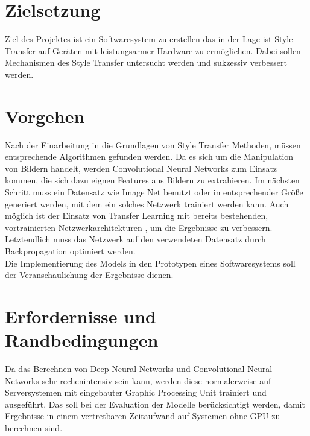 \section{Zielsetzung}
Ziel des Projektes ist ein Softwaresystem zu erstellen das in der Lage ist
Style Transfer auf Geräten mit leistungsarmer Hardware zu ermöglichen. Dabei sollen Mechanismen des Style Transfer
untersucht werden und sukzessiv verbessert werden.

\section{Vorgehen}
Nach der Einarbeitung in die Grundlagen von Style Transfer \cite{DBLP:journals/corr/GatysEB15a} \cite{DBLP:journals/corr/JohnsonAL16} Methoden,
müssen entsprechende Algorithmen gefunden werden. Da es sich um die Manipulation von Bildern handelt, werden Convolutional Neural Networks
\cite{lecun-gradientbased-learning-applied-1998} zum Einsatz kommen, die sich dazu eignen Features aus Bildern zu extrahieren. 
Im nächsten Schritt muss ein Datensatz wie Image Net \cite{imagenet_cvpr09} benutzt oder in entsprechender Größe generiert werden, mit dem ein solches Netzwerk trainiert 
werden kann. Auch möglich ist der Einsatz von Transfer Learning mit bereits bestehenden, vortrainierten Netzwerkarchitekturen
\cite{DBLP:journals/corr/SimonyanZ14a}, um die Ergebnisse zu verbessern. Letztendlich muss das Netzwerk auf den verwendeten Datensatz durch
Backpropagation \cite{doi:10.1162/neco.1989.1.4.541} optimiert werden.
\\
Die Implementierung des Models in den Prototypen eines Softwaresystems soll der Veranschaulichung der Ergebnisse dienen.

\pagebreak

\section{Erfordernisse und Randbedingungen}
Da das Berechnen von Deep Neural Networks und Convolutional Neural Networks sehr rechenintensiv sein kann,
werden diese normalerweise auf Serversystemen mit eingebauter Graphic Processing Unit trainiert und ausgeführt. Das soll bei der Evaluation der 
Modelle berücksichtigt werden, damit Ergebnisse in einem vertretbaren Zeitaufwand auf Systemen ohne GPU zu berechnen sind.

